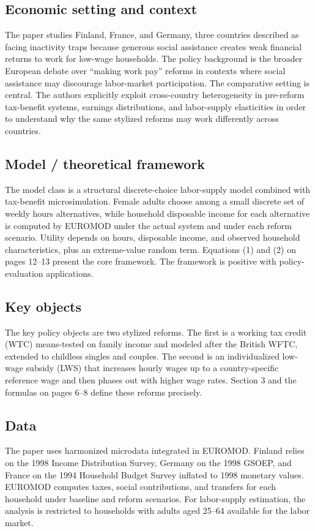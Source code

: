 \documentclass[11pt,a4paper]{article}
\begin{document}
\subsection*{Economic setting and context}
The paper studies Finland, France, and Germany, three countries described as facing inactivity traps because generous social assistance creates weak financial returns to work for low-wage households. The policy background is the broader European debate over “making work pay” reforms in contexts where social assistance may discourage labor-market participation. The comparative setting is central. The authors explicitly exploit cross-country heterogeneity in pre-reform tax-benefit systems, earnings distributions, and labor-supply elasticities in order to understand why the same stylized reforms may work differently across countries.

\subsection*{Model / theoretical framework}
The model class is a structural discrete-choice labor-supply model combined with tax-benefit microsimulation. Female adults choose among a small discrete set of weekly hours alternatives, while household disposable income for each alternative is computed by EUROMOD under the actual system and under each reform scenario. Utility depends on hours, disposable income, and observed household characteristics, plus an extreme-value random term. Equations (1) and (2) on pages 12–13 present the core framework. The framework is positive with policy-evaluation applications.

\subsection*{Key objects}
The key policy objects are two stylized reforms. The first is a working tax credit (WTC) means-tested on family income and modeled after the British WFTC, extended to childless singles and couples. The second is an individualized low-wage subsidy (LWS) that increases hourly wages up to a country-specific reference wage and then phases out with higher wage rates. Section 3 and the formulas on pages 6–8 define these reforms precisely.

\subsection*{Data}
The paper uses harmonized microdata integrated in EUROMOD. Finland relies on the 1998 Income Distribution Survey, Germany on the 1998 GSOEP, and France on the 1994 Household Budget Survey inflated to 1998 monetary values. EUROMOD computes taxes, social contributions, and transfers for each household under baseline and reform scenarios. For labor-supply estimation, the analysis is restricted to households with adults aged 25–64 available for the labor market.
\end{document}
